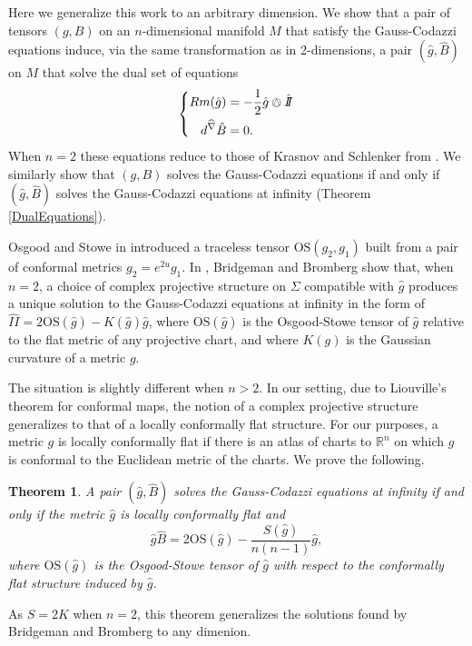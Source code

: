 \documentclass{amsart}
\newcommand{\R}{\mathbb{R}}
\newcommand{\two}{I\!\!I}
\newtheorem{bigthm}{Theorem}
\begin{document}
Here we generalize this work to an arbitrary dimension.
We show that a pair of tensors $(g,B)$ on an $n$-dimensional manifold $M$ that satisfy the Gauss-Codazzi equations induce, via the same transformation as in 2-dimensions, a pair $(\hat{g},\hat{B})$ on $M$ that solve the dual set of equations
\[
\left\{
\begin{aligned}
Rm(\hat{g}) &= -\frac{1}{2}\hat{g} \owedge \hat{\two} \\
d^{\widehat{\nabla}}\hat{B} &= 0.
\end{aligned}
\right.
\]
When $n=2$ these equations reduce to those of Krasnov and Schlenker from \cite{Krasnov-Schlenker2008}. 
We similarly show that $(g,B)$ solves the Gauss-Codazzi equations if and only if $(\hat{g},\hat{B})$ solves the Gauss-Codazzi equations at infinity (Theorem \ref{DualEquations}).


Osgood and Stowe in \cite{Osgood-Stowe1992} introduced a traceless tensor $\mathrm{OS}(g_2,g_1)$ built from a pair of conformal metrics $g_2 = e^{2u}g_1$.
In \cite{Bridgeman-Bromberg2022}, Bridgeman and Bromberg show that, when $n = 2$, a choice of complex projective structure on $\Sigma$ compatible with $\hat{g}$ produces a unique solution to the Gauss-Codazzi equations at infinity in the form of $\hat{\two} = 2\mathrm{OS}(\hat{g}) - K(\hat{g})\hat{g}$, where $\mathrm{OS}(\hat{g})$ is the Osgood-Stowe tensor of $\hat{g}$ relative to the flat metric of any projective chart, and where $K(g)$ is the Gaussian curvature of a metric $g$.

The situation is slightly different when $n > 2$.
In our setting, due to Liouville's theorem for conformal maps, the notion of a complex projective structure generalizes to that of a locally conformally flat structure. 
For our purposes, a metric $g$ is locally conformally flat if there is an atlas of charts to $\R^n$ on which $g$ is conformal to the Euclidean metric of the charts.
We prove the following.

\begin{bigthm}
\label{bigthm1}
A pair $(\hat{g},\hat{B})$ solves the Gauss-Codazzi equations at infinity if and only if the metric $\hat{g}$ is locally conformally flat and
\[
\hat{g} \hat{B} = 2\mathrm{OS}(\hat{g}) - \frac{S(\hat{g})}{n(n-1)}\hat{g},
\]
where $\mathrm{OS}(\hat{g})$ is the Osgood-Stowe tensor of $\hat{g}$ with respect to the conformally flat structure induced by $\hat{g}$.
\end{bigthm}
\noindent
As $S = 2K$ when $n=2$, this theorem generalizes the solutions found by Bridgeman and Bromberg to any dimenion.
\end{document}
